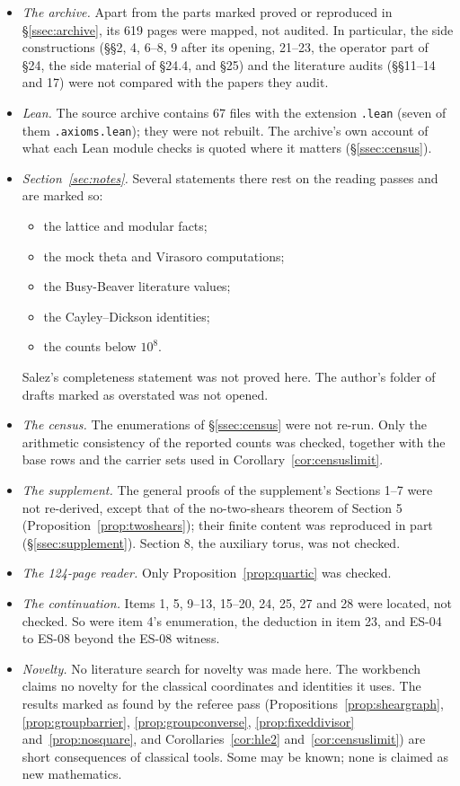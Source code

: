 \begin{itemize}
\item \emph{The archive.} Apart from the parts marked proved or reproduced in §\ref{ssec:archive}, its 619 pages were mapped, not audited. In particular, the side constructions (§§2, 4, 6--8, 9 after its opening, 21--23, the operator part of §24, the side material of §24.4, and §25) and the literature audits (§§11--14 and 17) were not compared with the papers they audit.
\item \emph{Lean.} The source archive contains 67 files with the extension \texttt{.lean} (seven of them \texttt{.axioms.lean}); they were not rebuilt. The archive's own account of what each Lean module checks is quoted where it matters (§\ref{ssec:census}).
\item \emph{Section~\ref{sec:notes}.} Several statements there rest on the reading passes and are marked so:
\begin{itemize}
\item the lattice and modular facts;
\item the mock theta and Virasoro computations;
\item the Busy-Beaver literature values;
\item the Cayley--Dickson identities;
\item the counts below $10^8$.
\end{itemize}
Salez's completeness statement was not proved here. The author's folder of drafts marked as overstated was not opened.
\item \emph{The census.} The enumerations of §\ref{ssec:census} were not re-run. Only the arithmetic consistency of the reported counts was checked, together with the base rows and the carrier sets used in Corollary~\ref{cor:censuslimit}.
\item \emph{The supplement.} The general proofs of the supplement's Sections 1--7 were not re-derived, except that of the no-two-shears theorem of Section 5 (Proposition~\ref{prop:twoshears}); their finite content was reproduced in part (§\ref{ssec:supplement}). Section 8, the auxiliary torus, was not checked.
\item \emph{The 124-page reader.} Only Proposition~\ref{prop:quartic} was checked.
\item \emph{The continuation.} Items 1, 5, 9--13, 15--20, 24, 25, 27 and 28 were located, not checked. So were item 4's enumeration, the deduction in item 23, and ES-04 to ES-08 beyond the ES-08 witness.
\item \emph{Novelty.} No literature search for novelty was made here. The workbench claims no novelty for the classical coordinates and identities it uses. The results marked as found by the referee pass (Propositions~\ref{prop:sheargraph}, \ref{prop:groupbarrier}, \ref{prop:groupconverse}, \ref{prop:fixeddivisor} and~\ref{prop:nosquare}, and Corollaries~\ref{cor:hle2} and~\ref{cor:censuslimit}) are short consequences of classical tools. Some may be known; none is claimed as new mathematics.
\end{itemize}
